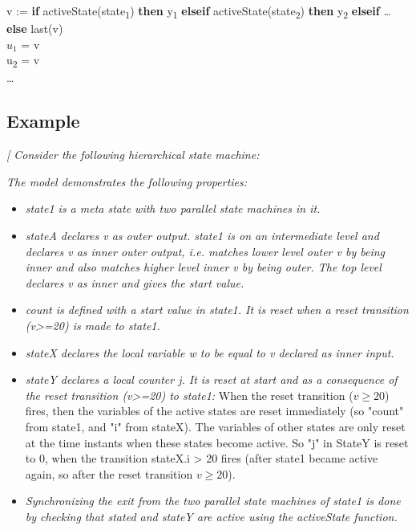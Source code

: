 \documentclass[10pt,a4paper]{report}
\def\doublelabel#1{\label{#1}\hypertarget{#1}{}}
\begin{document}
v := \textbf{if} activeState(state\textsubscript{1}) \textbf{then}
y\textsubscript{1} \textbf{elseif} activeState(state\textsubscript{2})
\textbf{then} y\textsubscript{2} \textbf{elseif} \ldots{} \textbf{else}
last(v)\\
$u_1$ = v\\
u\textsubscript{2} = v\\
\ldots{}

\subsection{Example}\doublelabel{example}

\emph{{[} Consider the following hierarchical state machine:}


\emph{The model demonstrates the following properties:}

\begin{itemize}
\item
  \emph{state1 is a meta state with two parallel state machines in it. }
\item
  \emph{stateA declares v as outer output. state1 is on an intermediate
  level and declares v as inner outer output, i.e. matches lower level
  outer v by being inner and also matches higher level inner v by being
  outer. The top level declares v as inner and gives the start value.}
\item
  \emph{count is defined with a start value in state1. It is reset when
  a reset transition (v\textgreater{}=20) is made to state1.}
\item
  \emph{stateX declares the local variable w to be equal to v declared
  as inner input.}
\item
  \emph{stateY declares a local counter j. It is reset at start and as a
  consequence of the reset transition (v\textgreater{}=20) to state1:}
  When the reset transition ($v\ge 20$) fires, then the variables of the
  active states are reset immediately (so "count" from state1, and "i"
  from stateX). The variables of other states are only reset at the time
  instants when these states become active. So "j" in StateY is reset to
  0, when the transition stateX.i \textgreater{} 20 fires (after state1
  became active again, so after the reset transition $v\ge 20$).
\item
  \emph{Synchronizing the exit from the two parallel state machines of
  state1 is done by checking that stated and stateY are active using the
  activeState function. }
\end{itemize}
\end{document}
